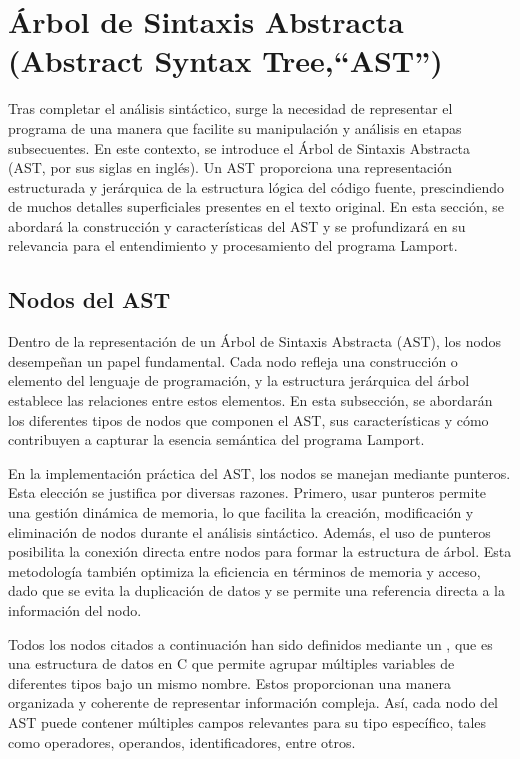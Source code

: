 \newpage

\section{Árbol de Sintaxis Abstracta (Abstract Syntax Tree,``AST'')}\label{sec:implementacionAST}
Tras completar el análisis sintáctico, surge la necesidad de representar el programa de una manera que facilite su manipulación y análisis en etapas subsecuentes. En este contexto, se introduce el Árbol de Sintaxis Abstracta (AST, por sus siglas en inglés). Un AST proporciona una representación estructurada y jerárquica de la estructura lógica del código fuente, prescindiendo de muchos detalles superficiales presentes en el texto original. En esta sección, se abordará la construcción y características del AST y se profundizará en su relevancia para el entendimiento y procesamiento del programa Lamport.

\subsection{Nodos del AST}
Dentro de la representación de un Árbol de Sintaxis Abstracta (AST), los nodos desempeñan un papel fundamental. Cada nodo refleja una construcción o elemento del lenguaje de programación, y la estructura jerárquica del árbol establece las relaciones entre estos elementos. En esta subsección, se abordarán los diferentes tipos de nodos que componen el AST, sus características y cómo contribuyen a capturar la esencia semántica del programa Lamport.

\vspace{0.5cm}

En la implementación práctica del AST, los nodos se manejan mediante punteros. Esta elección se justifica por diversas razones. Primero, usar punteros permite una gestión dinámica de memoria, lo que facilita la creación, modificación y eliminación de nodos durante el análisis sintáctico. Además, el uso de punteros posibilita la conexión directa entre nodos para formar la estructura de árbol. Esta metodología también optimiza la eficiencia en términos de memoria y acceso, dado que se evita la duplicación de datos y se permite una referencia directa a la información del nodo.

\vspace{0.5cm}
Todos los nodos citados a continuación han sido definidos mediante un , que es una estructura de datos en C que permite agrupar múltiples variables de diferentes tipos bajo un mismo nombre. Estos  proporcionan una manera organizada y coherente de representar información compleja. Así, cada nodo del AST puede contener múltiples campos relevantes para su tipo específico, tales como operadores, operandos, identificadores, entre otros. 

